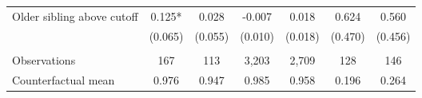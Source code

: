 {{\begin{tabular}{lcccccc}
Older sibling above cutoff&       0.125*  &       0.028   &      -0.007   &       0.018   &       0.624   &       0.560   \\
                    &     (0.065)   &     (0.055)   &     (0.010)   &     (0.018)   &     (0.470)   &     (0.456)   \\
                    &               &               &               &               &               &               \\
Observations        &         167   &         113   &       3,203   &       2,709   &         128   &         146   \\
Counterfactual mean &       0.976   &       0.947   &       0.985   &       0.958   &       0.196   &       0.264   \\
 

\bottomrule
\end{tabular}
}
}
